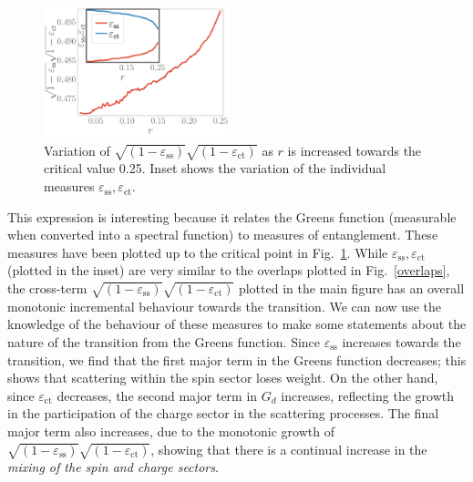 \documentclass[reprint,superscriptaddress,floatfix]{revtex4-2}
\begin{document}
\begin{figure}[!htb]
	\centering
	\includegraphics[width=0.48\textwidth]{entanglement.pdf}
	\caption{Variation of \(\sqrt{\left(1 - \varepsilon_\text{ss} \right)}\sqrt{\left(1 - \varepsilon_\text{ct} \right)}\) as \(r\) is increased towards the critical value 0.25. Inset shows the variation of the individual measures \(\varepsilon_\text{ss},\varepsilon_\text{ct}\).}
	\label{entng}
\end{figure}

This expression is interesting because it relates the Greens function (measurable when converted into a spectral function) to measures of entanglement.
These measures have been plotted up to the critical point in Fig.~\ref{entng}.
While \(\varepsilon_\text{ss},\varepsilon_\text{ct}\) (plotted in the inset) are very similar to the overlaps plotted in Fig.~\ref{overlaps}, the cross-term \(\sqrt{\left(1 - \varepsilon_\text{ss} \right)}\sqrt{\left(1 - \varepsilon_\text{ct} \right)}\) plotted in the main figure has an overall monotonic incremental behaviour towards the transition.
We can now use the knowledge of the behaviour of these measures to make some statements about the nature of the transition from the Greens function.
Since \(\varepsilon_\text{ss}\) increases towards the transition, we find that the first major term in the Greens function decreases; this shows that scattering within the spin sector loses weight.
On the other hand, since \(\varepsilon_\text{ct}\) decreases, the second major term in \(G_d\) increases, reflecting the growth in the participation of the charge sector in the scattering processes.
The final major term also increases, due to the monotonic growth of \(\sqrt{\left(1 - \varepsilon_\text{ss} \right)}\sqrt{\left(1 - \varepsilon_\text{ct} \right)}\), showing that there is a continual increase in the {\it mixing of the spin and charge sectors}.
\end{document}
